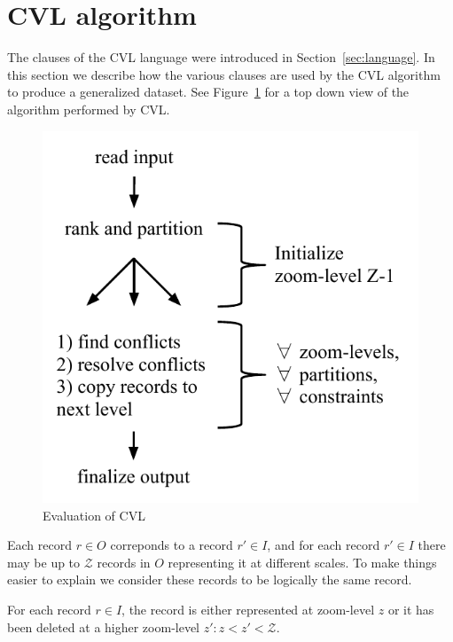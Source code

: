 \section{CVL algorithm}

The clauses of the CVL language were introduced in Section~\ref{sec:language}. In this section we describe how the various clauses are used by the CVL algorithm to produce a generalized dataset. See Figure~\ref{fig:evaluation} for a top down view of the algorithm performed by CVL.

\begin{figure}[htbp]
\begin{center}
\includegraphics[scale=.8]{figs/evaluation.pdf}
\caption{Evaluation of CVL}
\label{fig:evaluation}
\end{center}
\end{figure}

Each record $r \in O$ correponds to a record $r' \in I$, and for each record $r' \in I$ there may be up to $\mathcal{Z}$ records in $O$ representing it at different scales. To make things easier to explain we consider these records to be logically the same record.

For each record $r \in I$, the record is either represented at zoom-level $z$ or it has been deleted at a higher zoom-level $z': z < z' < \mathcal{Z}$.

